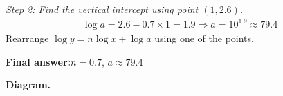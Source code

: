 \documentclass[11pt]{article}
\begin{document}
\textit{Step 2: Find the vertical intercept using point \( (1, 2.6) \).}
\[\begin{gathered}
\log a = 2.6 - 0.7 \times 1 = 1.9 \Rightarrow a = 10^{1.9} \approx 79.4
\end{gathered}\]
Rearrange \( \log y = n\log x + \log a \) using one of the points.

\begin{answerbox}
\textbf{Final answer:}\quad \(\displaystyle  n = 0.7 \), \(\displaystyle  a \approx 79.4 \)
\end{answerbox}
\textbf{Diagram.}

\begin{center}
\end{center}
\end{document}
